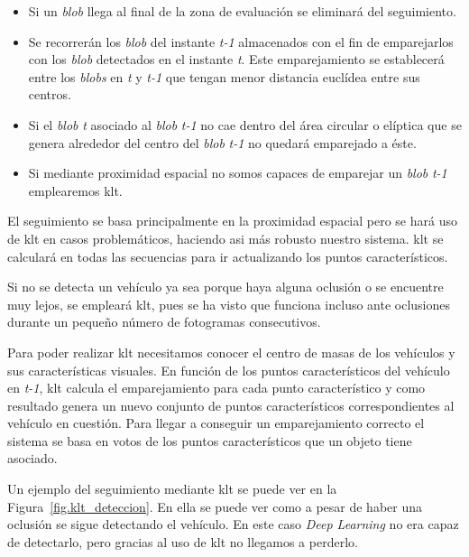 \begin{itemize}
    \item Si un \textit{blob} llega al final de la zona de evaluación se eliminará del seguimiento.
    \item Se recorrerán los \textit{blob} del instante \textit{t-1} almacenados con el fin de emparejarlos con los \textit{blob} detectados en el instante \textit{t}. Este emparejamiento se establecerá entre los \textit{blobs} en \textit{t} y \textit{t-1} que tengan menor distancia euclídea entre sus centros.
    \item Si el \textit{blob} \textit{t} asociado al \textit{blob} \textit{t-1} no cae dentro del área circular o elíptica que se genera alrededor del centro del  \textit{blob} \textit{t-1} no quedará emparejado a éste. 
    \item Si mediante proximidad espacial no somos capaces de emparejar un \textit{blob} \textit{t-1} emplearemos \acrshort{klt}.
\end{itemize}

El seguimiento se basa principalmente en la proximidad espacial pero se hará uso de \acrshort{klt} en casos problemáticos, haciendo asi más robusto nuestro sistema. \acrshort{klt} se calculará en todas las secuencias para ir actualizando los puntos característicos.

Si no se detecta un vehículo ya sea porque haya alguna oclusión o se encuentre muy lejos, se empleará \acrshort{klt}, pues se ha visto que funciona incluso ante oclusiones durante un pequeño número de fotogramas consecutivos.

Para poder realizar \acrshort{klt} necesitamos conocer el centro de masas de los vehículos y sus características visuales. En función de los puntos característicos del vehículo en \textit{t-1}, \acrshort{klt} calcula el emparejamiento para cada punto característico y como resultado genera un nuevo conjunto de puntos característicos correspondientes al vehículo en cuestión. Para llegar a conseguir un emparejamiento correcto el sistema se basa en votos de los puntos característicos que un objeto tiene asociado. 

Un ejemplo del seguimiento mediante \acrshort{klt} se puede ver en la Figura~\ref{fig.klt_deteccion}. En ella se puede ver como a pesar de haber una oclusión se sigue detectando el vehículo. En este caso \textit{Deep Learning} no era capaz de detectarlo, pero gracias al uso de \acrshort{klt} no llegamos a perderlo.

